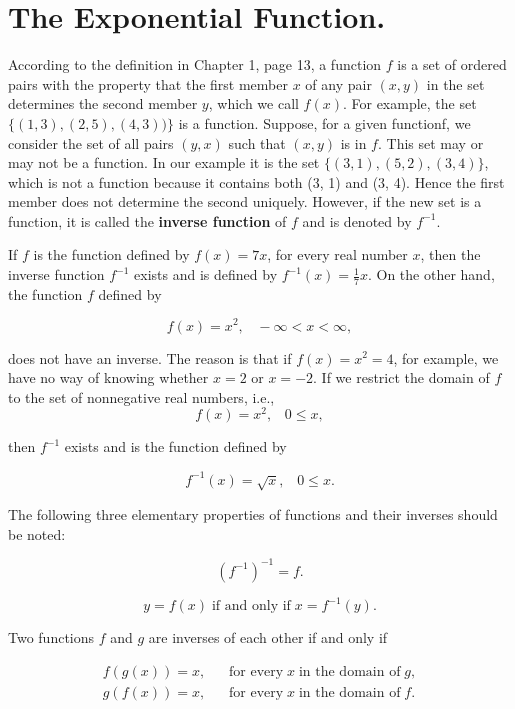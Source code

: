 \section{The Exponential Function.}\label{sec 5.2} 
According to the definition in Chapter 1, page 13, a function $f$ is a set of ordered pairs with the property that the first member $x$ of any pair $(x, y)$ in the set determines the second member $y$, which we call $f(x)$. For example, the set $\{(1, 3), (2, 5), (4, 3))\}$ is a function. Suppose, for a given functionf, we consider the set of all pairs $(y, x)$ such that $(x, y)$ is in $f$. This set may or may not be a function. In our example it is the set $\{(3, 1), (5, 2), (3, 4)\}$, which is not a function because it contains both (3, 1) and (3, 4). Hence the first member does not determine the second uniquely. However, if the new set is a function, it is called the \textbf{inverse function} of $f$ and is denoted by $f^{-1}$.

If $f$ is the function defined by $f(x) = 7x$, for every real number $x$, then the inverse function $f^{-1}$ exists and is defined by $f^{-1}(x) = \frac{1}{7}x$. On the other hand, the function $f$ defined by

$$
f(x) = x^2, \;\;\; -\infty < x < \infty,
$$

\noindent does not have an inverse. The reason is that if $f(x) = x^2 = 4$, for example, we have no way of knowing whether $x = 2$ or $x = - 2$. If we restrict the domain of $f$ to the set of nonnegative real numbers, i.e.,
$$
f(x) = x^2, \;\;\; 0 \leq x, 
$$

\noindent then $f^{-1}$ exists and is the function defined by

$$
f^{-1}(x) = \sqrt x, \;\;\; 0 \leq x.
$$

The following three elementary properties of functions and their inverses
should be noted: 

\begin{theorem} %
$$
(f^{-1})^{-1} = f. 
$$
\end{theorem}

 
\begin{theorem} %
$$
y = f (x) \;\mbox{if and only if}\; x = f^{-1}(y).
$$
\end{theorem}

\begin{theorem} %
Two functions $f$ and $g$ are inverses of each other if and only if 

$$
\begin{array}{ll}
f(g(x)) = x, &\;\;\; \mbox{for every}\; x \;\mbox{in the domain of}\; g,\\
g(f(x)) = x, &\;\;\; \mbox{for every}\; x \;\mbox{in the domain of}\; f. 
\end{array}
$$
\end{theorem}


